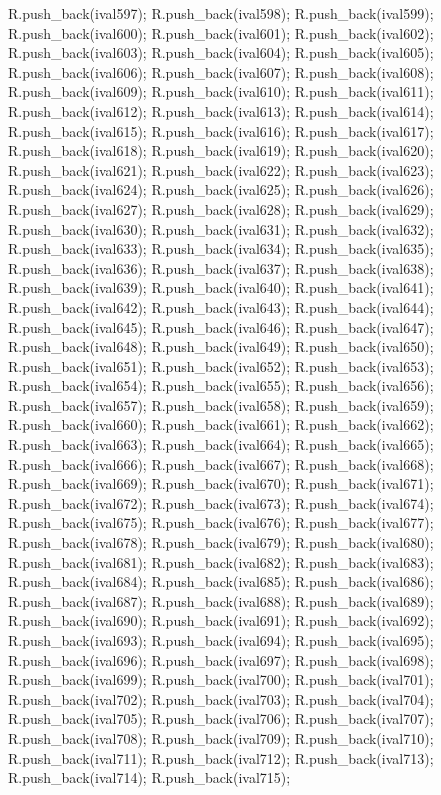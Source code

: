 \begin{DoxyCode}
{R.push_back(ival597);
R.push_back(ival598);
R.push_back(ival599);
R.push_back(ival600);
R.push_back(ival601);
R.push_back(ival602);
R.push_back(ival603);
R.push_back(ival604);
R.push_back(ival605);
R.push_back(ival606);
R.push_back(ival607);
R.push_back(ival608);
R.push_back(ival609);
R.push_back(ival610);
R.push_back(ival611);
R.push_back(ival612);
R.push_back(ival613);
R.push_back(ival614);
R.push_back(ival615);
R.push_back(ival616);
R.push_back(ival617);
R.push_back(ival618);
R.push_back(ival619);
R.push_back(ival620);
R.push_back(ival621);
R.push_back(ival622);
R.push_back(ival623);
R.push_back(ival624);
R.push_back(ival625);
R.push_back(ival626);
R.push_back(ival627);
R.push_back(ival628);
R.push_back(ival629);
R.push_back(ival630);
R.push_back(ival631);
R.push_back(ival632);
R.push_back(ival633);
R.push_back(ival634);
R.push_back(ival635);
R.push_back(ival636);
R.push_back(ival637);
R.push_back(ival638);
R.push_back(ival639);
R.push_back(ival640);
R.push_back(ival641);
R.push_back(ival642);
R.push_back(ival643);
R.push_back(ival644);
R.push_back(ival645);
R.push_back(ival646);
R.push_back(ival647);
R.push_back(ival648);
R.push_back(ival649);
R.push_back(ival650);
R.push_back(ival651);
R.push_back(ival652);
R.push_back(ival653);
R.push_back(ival654);
R.push_back(ival655);
R.push_back(ival656);
R.push_back(ival657);
R.push_back(ival658);
R.push_back(ival659);
R.push_back(ival660);
R.push_back(ival661);
R.push_back(ival662);
R.push_back(ival663);
R.push_back(ival664);
R.push_back(ival665);
R.push_back(ival666);
R.push_back(ival667);
R.push_back(ival668);
R.push_back(ival669);
R.push_back(ival670);
R.push_back(ival671);
R.push_back(ival672);
R.push_back(ival673);
R.push_back(ival674);
R.push_back(ival675);
R.push_back(ival676);
R.push_back(ival677);
R.push_back(ival678);
R.push_back(ival679);
R.push_back(ival680);
R.push_back(ival681);
R.push_back(ival682);
R.push_back(ival683);
R.push_back(ival684);
R.push_back(ival685);
R.push_back(ival686);
R.push_back(ival687);
R.push_back(ival688);
R.push_back(ival689);
R.push_back(ival690);
R.push_back(ival691);
R.push_back(ival692);
R.push_back(ival693);
R.push_back(ival694);
R.push_back(ival695);
R.push_back(ival696);
R.push_back(ival697);
R.push_back(ival698);
R.push_back(ival699);
R.push_back(ival700);
R.push_back(ival701);
R.push_back(ival702);
R.push_back(ival703);
R.push_back(ival704);
R.push_back(ival705);
R.push_back(ival706);
R.push_back(ival707);
R.push_back(ival708);
R.push_back(ival709);
R.push_back(ival710);
R.push_back(ival711);
R.push_back(ival712);
R.push_back(ival713);
R.push_back(ival714);
R.push_back(ival715);
}
\end{DoxyCode}
